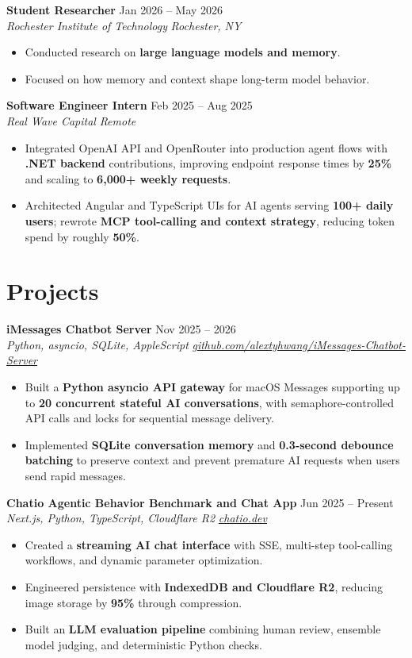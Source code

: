 \documentclass[10pt,letterpaper]{article}
\newif\ifresumeFirstRole
\newcommand{\resumeRole}[4]{%
  \ifresumeFirstRole
    \global\resumeFirstRolefalse
  \else
    \vspace{0pt plus 1fill}%
  \fi
  \textbf{#1} \hfill #2\\
  \textit{#3} \hfill \textit{#4}
}
\begin{document}
\resumeRole{Student Researcher}{Jan 2026 -- May 2026}{Rochester Institute of Technology}{Rochester, NY}
\begin{itemize}
  \item Conducted research on \textbf{large language models and memory}.
  \item Focused on how memory and context shape long-term model behavior.
\end{itemize}

\resumeRole{Software Engineer Intern}{Feb 2025 -- Aug 2025}{Real Wave Capital}{Remote}
\begin{itemize}
  \item Integrated OpenAI API and OpenRouter into production agent flows with \textbf{.NET backend} contributions, improving endpoint response times by \textbf{25\%} and scaling to \textbf{6,000+ weekly requests}.
  \item Architected Angular and TypeScript UIs for AI agents serving \textbf{100+ daily users}; rewrote \textbf{MCP tool-calling and context strategy}, reducing token spend by roughly \textbf{50\%}.
\end{itemize}

\section*{Projects}
\resumeRole{iMessages Chatbot Server}{Nov 2025 -- 2026}{Python, asyncio, SQLite, AppleScript}{\href{https://github.com/alextyhwang/iMessages-Chatbot-Server}{github.com/alextyhwang/iMessages-Chatbot-Server}}
\begin{itemize}
  \item Built a \textbf{Python asyncio API gateway} for macOS Messages supporting up to \textbf{20 concurrent stateful AI conversations}, with semaphore-controlled API calls and locks for sequential message delivery.
  \item Implemented \textbf{SQLite conversation memory} and \textbf{0.3-second debounce batching} to preserve context and prevent premature AI requests when users send rapid messages.
\end{itemize}

\resumeRole{Chatio Agentic Behavior Benchmark and Chat App}{Jun 2025 -- Present}{Next.js, Python, TypeScript, Cloudflare R2}{\href{https://chatio.dev}{chatio.dev}}
\begin{itemize}
  \item Created a \textbf{streaming AI chat interface} with SSE, multi-step tool-calling workflows, and dynamic parameter optimization.
  \item Engineered persistence with \textbf{IndexedDB and Cloudflare R2}, reducing image storage by \textbf{95\%} through compression.
  \item Built an \textbf{LLM evaluation pipeline} combining human review, ensemble model judging, and deterministic Python checks.
\end{itemize}
\end{document}
